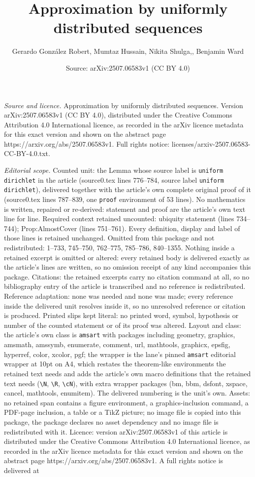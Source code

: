 \documentclass[10pt,a4paper]{amsart}
\title[Approximation by uniformly distributed sequences]{Approximation by uniformly distributed sequences}
\author{Gerardo Gonz\'alez Robert, Mumtaz Hussain, Nikita Shulga,, Benjamin Ward}
\date{Source: arXiv:2507.06583v1 (CC BY 4.0)}
\begin{document}
\maketitle

\noindent\emph{Source and licence.} Approximation by uniformly distributed sequences. Version arXiv:2507.06583v1 (CC BY 4.0), distributed under the Creative Commons Attribution 4.0 International licence, as recorded in the arXiv licence metadata for this exact version and shown on the abstract page https://arxiv.org/abs/2507.06583v1. Full rights notice: licenses/arxiv-2507.06583-CC-BY-4.0.txt.\par\smallskip

\noindent\textit{Editorial scope.} Counted unit: the Lemma whose source label is \texttt{uniform dirichlet} in the article (source0.tex lines 776--784, source label \texttt{uniform dirichlet}), delivered together with the article's own complete original proof of it (source0.tex lines 787--839, one \texttt{proof} environment of 53 lines). No mathematics is written, repaired or re-derived: statement and proof are the article's own text line for line. Required context retained uncounted: ubiquity statement (lines 734--744); Prop:AlmostCover (lines 751--761). Every definition, display and label of those lines is retained unchanged. Omitted from this package and not redistributed: 1--733, 745--750, 762--775, 785--786, 840--1355. Nothing inside a retained excerpt is omitted or altered: every retained body is delivered exactly as the article's lines are written, so no omission receipt of any kind accompanies this package. Citations: the retained excerpts carry no citation command at all, so no bibliography entry of the article is transcribed and no reference is redistributed. Reference adaptation: none was needed and none was made; every reference inside the delivered unit resolves inside it, so no unresolved reference or citation is produced. Printed slips kept literal: no printed word, symbol, hypothesis or number of the counted statement or of its proof was altered. Layout and class: the article's own class is \texttt{amsart} with packages including geometry, graphics, amsmath, amssymb, enumerate, comment, url, mathtools, graphicx, epsfig, hyperref, color, xcolor, pgf; the wrapper is the lane's pinned \texttt{amsart} editorial wrapper at 10pt on A4, which restates the theorem-like environments the retained text needs and adds the article's own macro definitions that the retained text needs (\texttt{\textbackslash N}, \texttt{\textbackslash R}, \texttt{\textbackslash cN}), with extra wrapper packages (bm, bbm, dsfont, xspace, cancel, mathtools, enumitem). The delivered numbering is the unit's own. Assets: no retained span contains a figure environment, a graphics-inclusion command, a PDF-page inclusion, a table or a TikZ picture; no image file is copied into this package, the package declares no asset dependency and no image file is redistributed with it. Licence: version arXiv:2507.06583v1 of this article is distributed under the Creative Commons Attribution 4.0 International licence, as recorded in the arXiv licence metadata for this exact version and shown on the abstract page https://arxiv.org/abs/2507.06583v1. A full rights notice is delivered at 
\end{document}
